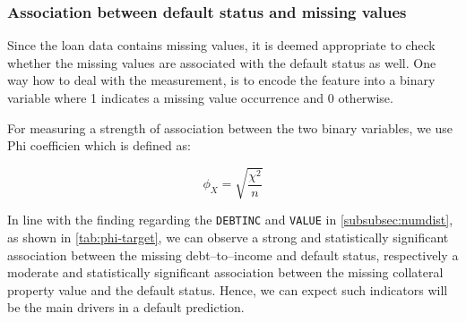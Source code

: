 \subsubsection{Association between default status and missing values}
\label{subsubsec:target-na-ass}

Since the loan data contains missing values, it is deemed appropriate to check whether the missing values are associated with the default status as well. One way how to deal with the measurement, is to encode the feature into a binary variable where 1 indicates a missing value occurrence and 0 otherwise.

For measuring a strength of association between the two binary variables, we use Phi coefficien which is defined as:

\begin{equation}\label{eq}
    \phi_{X} = \sqrt{\frac{\chi^{2}}{n}}
    \end{equation}

In line with the finding regarding the \texttt{DEBTINC} and \texttt{VALUE} in \autoref{subsubsec:numdist}, as shown in \autoref{tab:phi-target}, we can observe a strong and statistically significant association between the missing debt--to--income and default status, respectively a moderate and statistically significant association between the missing collateral property value and the default status. Hence, we can expect such indicators will be the main drivers in a default prediction.

